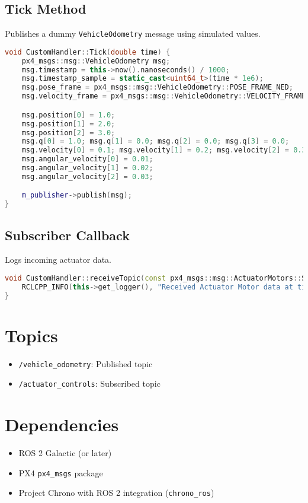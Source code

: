 \documentclass{article}
\begin{document}
\subsection*{Tick Method}
Publishes a dummy \texttt{VehicleOdometry} message using simulated values.
\begin{lstlisting}[language=C++]
void CustomHandler::Tick(double time) {
    px4_msgs::msg::VehicleOdometry msg;
    msg.timestamp = this->now().nanoseconds() / 1000;
    msg.timestamp_sample = static_cast<uint64_t>(time * 1e6);
    msg.pose_frame = px4_msgs::msg::VehicleOdometry::POSE_FRAME_NED;
    msg.velocity_frame = px4_msgs::msg::VehicleOdometry::VELOCITY_FRAME_BODY_FRD;

    msg.position[0] = 1.0;
    msg.position[1] = 2.0;
    msg.position[2] = 3.0;
    msg.q[0] = 1.0; msg.q[1] = 0.0; msg.q[2] = 0.0; msg.q[3] = 0.0;
    msg.velocity[0] = 0.1; msg.velocity[1] = 0.2; msg.velocity[2] = 0.3;
    msg.angular_velocity[0] = 0.01;
    msg.angular_velocity[1] = 0.02;
    msg.angular_velocity[2] = 0.03;

    m_publisher->publish(msg);
}
\end{lstlisting}

\subsection*{Subscriber Callback}
Logs incoming actuator data.
\begin{lstlisting}[language=C++]
void CustomHandler::receiveTopic(const px4_msgs::msg::ActuatorMotors::SharedPtr msg) const {
    RCLCPP_INFO(this->get_logger(), "Received Actuator Motor data at time %f", msg->timestamp);
}
\end{lstlisting}

\section*{Topics}
\begin{itemize}
    \item \texttt{/vehicle\_odometry}: Published topic
    \item \texttt{/actuator\_controls}: Subscribed topic
\end{itemize}

\section*{Dependencies}
\begin{itemize}
    \item ROS 2 Galactic (or later)
    \item PX4 \texttt{px4\_msgs} package
    \item Project Chrono with ROS 2 integration (\texttt{chrono\_ros})
\end{itemize}
\end{document}
